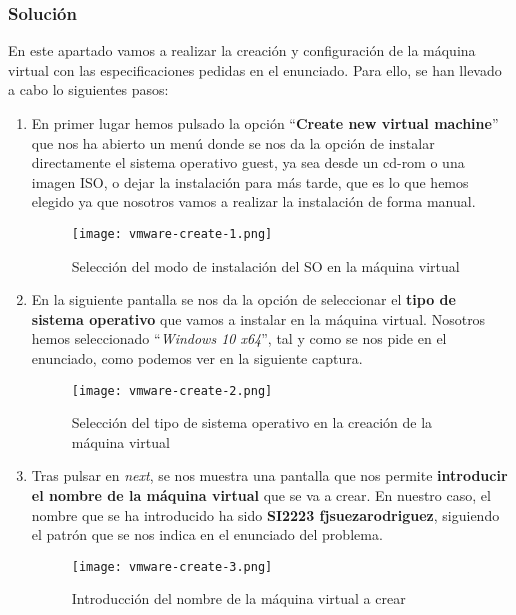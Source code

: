 \subsubsection{Solución}
En este apartado vamos a realizar la creación y configuración de la máquina virtual con las especificaciones pedidas en el enunciado. Para ello, se han llevado a cabo lo siguientes pasos:

\begin{enumerate}
    \item En primer lugar hemos pulsado la opción ``\textbf{Create new virtual machine}'' que nos ha abierto un menú donde se nos da la opción de instalar directamente el sistema operativo guest, ya sea desde un cd-rom o una imagen ISO, o dejar la instalación para más tarde, que es lo que hemos elegido ya que nosotros vamos a realizar la instalación de forma manual.

    \begin{figure}[H]
        \centering
        \texttt{[image: vmware-create-1.png]}
        \caption{Selección del modo de instalación del SO en la máquina virtual}
    \end{figure}

    \item En la siguiente pantalla se nos da la opción de seleccionar el \textbf{tipo de sistema operativo} que vamos a instalar en la máquina virtual. Nosotros hemos seleccionado ``\textit{Windows 10 x64}'', tal y como se nos pide en el enunciado, como podemos ver en la siguiente captura.

    \begin{figure}[H]
        \centering
        \texttt{[image: vmware-create-2.png]}
        \caption{Selección del tipo de sistema operativo en la creación de la máquina virtual}
    \end{figure}

    \item Tras pulsar en \textit{next}, se nos muestra una pantalla que nos permite \textbf{introducir el nombre de la máquina virtual} que se va a crear. En nuestro caso, el nombre que se ha introducido ha sido \textbf{SI2223 fjsuezarodriguez}, siguiendo el patrón que se nos indica en el enunciado del problema.

    \begin{figure}[H]
        \centering
        \texttt{[image: vmware-create-3.png]}
        \caption{Introducción del nombre de la máquina virtual a crear}
    \end{figure}


\end{enumerate}
